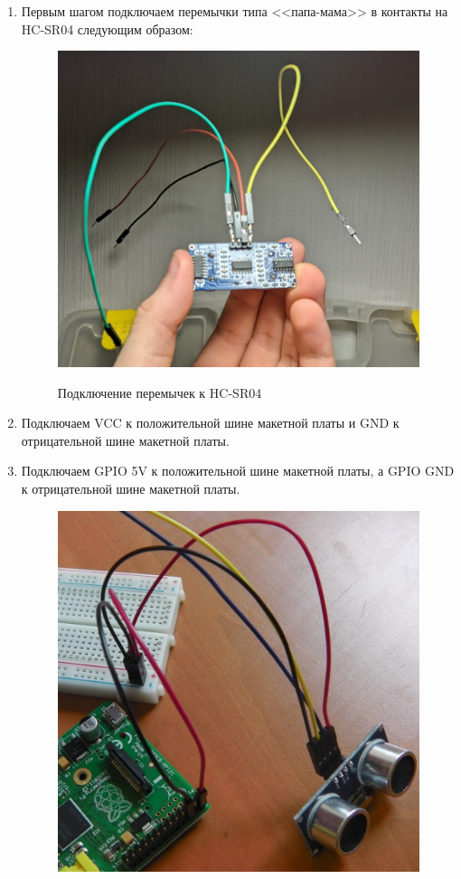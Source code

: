 \documentclass[a4paper, 14pt]{article}
\begin{document}
\begin{enumerate}
	\item Первым шагом подключаем перемычки типа <<папа-мама>> в контакты на HC-SR04 следующим образом:
	      \begin{figure}[H]
		      \centering
		      \includegraphics[width=12cm]{screenshots/6.png}\\
		      \caption{Подключение перемычек к HC-SR04}
	      \end{figure}
	\item Подключаем VCC к положительной шине макетной платы и GND к отрицательной шине макетной платы.
	\item Подключаем GPIO 5V к положительной шине макетной платы, а GPIO GND к отрицательной шине макетной платы.
	      \begin{figure}[H]
		      \centering
		      \includegraphics[width=14cm]{screenshots/7.png}\\

\end{figure}
\end{enumerate}
\end{document}
